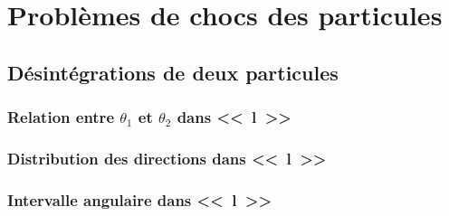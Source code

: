 \chapter{Probl\`emes de chocs des particules}

\section{D\'esint\'egrations de deux particules}

\subsection{Relation entre $\theta_{1}$ et $\theta_{2}$ dans <<~l~>>}

\subsection{Distribution des directions dans <<~l~>>}

\subsection{Intervalle angulaire dans <<~l~>>}